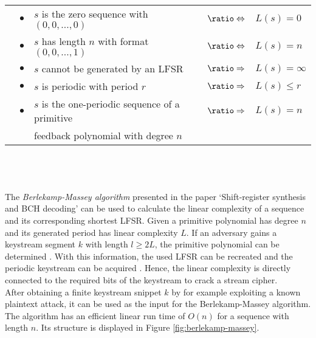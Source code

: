 \bgroup
\def\arraystretch{1.2}
\begin{tabular}{lllll}
	&$\bullet$&$s$ is the zero sequence with $(0, 0, ..., 0)$ & $\logeq$ & $L(s)=0$ \\
	&$\bullet$& $s$ has length $n$ with format $(0, 0, ..., 1)$ & $\logeq$ & $L(s) = n$\\
	&$\bullet$& $s$ cannot be generated by an LFSR  & $\logright$ & $ L(s) = \infty$\\
	&$\bullet$&  $s$ is periodic with period $r$ & $\logright$ & $L(s) \leq  r$\\
	&$\bullet$& $s$ is the one-periodic sequence of a primitive  & $\logright$ & $L(s) = n$ \\
	&&feedback polynomial with degree $n$&& \\
\end{tabular}
\egroup
\\\\\\
The \emph{Berlekamp-Massey algorithm} presented in the paper ‘Shift-register synthesis and BCH decoding’ can be used to calculate the linear complexity of a sequence and its corresponding shortest LFSR. Given a primitive polynomial has degree $n$ and its generated period has linear complexity $L$. If an adversary gains a keystream segment $k$ with length $l \geq 2L$, the primitive polynomial can be determined \cite[pp. 124-125]{Massey.1969}. With this information, the used LFSR can be recreated and the periodic keystream can be acquired \cite[p. 232]{Smart.2016}. Hence, the linear complexity is directly connected to the required bits of the keystream to crack a stream cipher. \\

After obtaining a finite keystream snippet $k$ by for example exploiting a known plaintext attack, it can be used as the input for the Berlekamp-Massey algorithm. The algorithm has an efficient linear run time of $O(n)$ for a sequence with length $n$. Its structure is displayed in Figure \ref{fig:berlekamp-massey}.  \\

